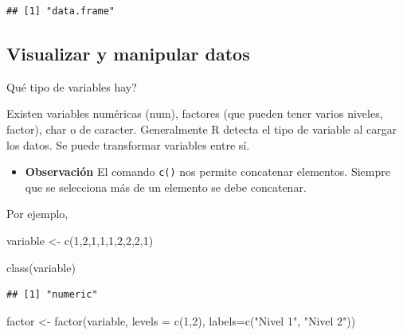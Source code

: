 \documentclass[
]{book}
\newenvironment{Shaded}{\begin{snugshade}}{\end{snugshade}}
\newcommand{\AttributeTok}[1]{\textcolor[rgb]{0.77,0.63,0.00}{#1}}
\newcommand{\DecValTok}[1]{\textcolor[rgb]{0.00,0.00,0.81}{#1}}
\newcommand{\FunctionTok}[1]{\textcolor[rgb]{0.00,0.00,0.00}{#1}}
\newcommand{\NormalTok}[1]{#1}
\newcommand{\OtherTok}[1]{\textcolor[rgb]{0.56,0.35,0.01}{#1}}
\newcommand{\StringTok}[1]{\textcolor[rgb]{0.31,0.60,0.02}{#1}}
\providecommand{\tightlist}{%
  \setlength{\itemsep}{0pt}\setlength{\parskip}{0pt}}
\begin{document}
\begin{verbatim}
## [1] "data.frame"
\end{verbatim}

\hypertarget{visualizar-y-manipular-datos}{%
\subsection{\texorpdfstring{Visualizar y manipular \textbf{datos}}{Visualizar y manipular datos}}\label{visualizar-y-manipular-datos}}

Qué tipo de variables hay?

Existen variables numéricas (num), factores (que pueden tener varios niveles, factor), char o de caracter. Generalmente R detecta el tipo de variable al cargar los datos. Se puede transformar variables entre sí.

\begin{itemize}
\tightlist
\item
  \textbf{Observación} El comando \texttt{c()} nos permite concatenar elementos. Siempre que se selecciona más de un elemento se debe concatenar.
\end{itemize}

Por ejemplo,

\begin{Shaded}
\begin{Highlighting}[]
\NormalTok{variable }\OtherTok{\textless{}{-}} \FunctionTok{c}\NormalTok{(}\DecValTok{1}\NormalTok{,}\DecValTok{2}\NormalTok{,}\DecValTok{1}\NormalTok{,}\DecValTok{1}\NormalTok{,}\DecValTok{1}\NormalTok{,}\DecValTok{2}\NormalTok{,}\DecValTok{2}\NormalTok{,}\DecValTok{2}\NormalTok{,}\DecValTok{1}\NormalTok{)}

\FunctionTok{class}\NormalTok{(variable)}
\end{Highlighting}
\end{Shaded}

\begin{verbatim}
## [1] "numeric"
\end{verbatim}

\begin{Shaded}
\begin{Highlighting}[]
\NormalTok{factor }\OtherTok{\textless{}{-}} \FunctionTok{factor}\NormalTok{(variable, }\AttributeTok{levels =} \FunctionTok{c}\NormalTok{(}\DecValTok{1}\NormalTok{,}\DecValTok{2}\NormalTok{), }\AttributeTok{labels=}\FunctionTok{c}\NormalTok{(}\StringTok{"Nivel 1"}\NormalTok{, }\StringTok{"Nivel 2"}\NormalTok{))}
\end{Highlighting}
\end{Shaded}
\end{document}
